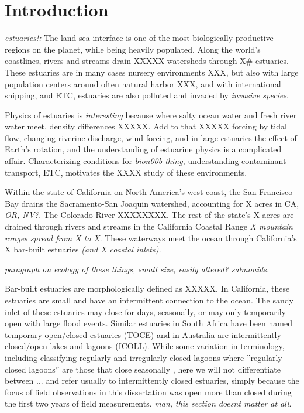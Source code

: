 \chapter{Introduction}
\label{chIntro}

\emph{estuaries!:}
The land-sea interface is one of the most biologically productive regions on the planet, while being heavily populated. Along the world's coastlines, rivers and streams drain XXXXX watersheds through X\# estuaries.  These estuaries are in many cases nursery environments XXX, but also with large population centers around often natural harbor XXX, and with international shipping, and ETC, estuaries are also polluted and invaded by \emph{invasive species}. 

Physics of estuaries is \emph{interesting} because where salty ocean water and fresh river water meet, density differences XXXXX. Add to that XXXXX forcing by tidal flow, changing riverine discharge, wind forcing, and in large estuaries the effect of Earth's rotation, and the understanding of estuarine physics is a complicated affair. Characterizing conditions for \emph{bion00b thing}, understanding contaminant transport, ETC, motivates the XXXX study of these environments. 

Within the state of California on North America's west coast, the San Francisco Bay drains the Sacramento-San Joaquin watershed, accounting for X acres in CA, \emph{OR, NV?}. The Colorado River XXXXXXXX. The rest of the state's X acres are drained through rivers and streams in the California Coastal Range \emph{X mountain ranges spread from X to X}. These waterways meet the ocean through California's X bar-built estuaries \emph{(and X coastal inlets).}

\emph{paragraph on ecology of these things, small size, easily altered? salmonids.}

Bar-built estuaries are morphologically defined as XXXXX. In California, these estuaries are small and have an intermittent connection to the ocean. The sandy inlet of these estuaries may close for days, seasonally, or may only temporarily open with large flood events. Similar estuaries in South Africa have been named temporary open/closed estuaries (TOCE) and in Australia are intermittently closed/open lakes and lagoons (ICOLL). While some variation in terminology, including classifying regularly and irregularly closed lagoons where ''regularly closed lagoons'' are  those that close seasonally \parencite{davidson_simple_2009}, here we will not differentiate between ... and refer usually to intermittently closed estuaries, simply because the focus of field observations in this dissertation was open more than closed during the first two years of field measurements. \emph{man, this section doesnt matter at all}. 

